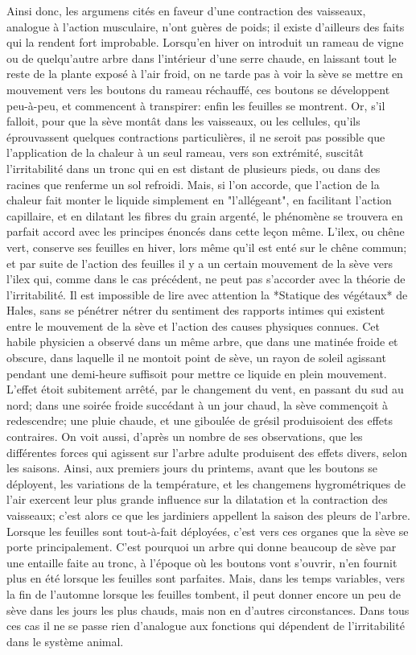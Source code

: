 Ainsi donc, les argumens cités en faveur d'une contraction des vaisseaux, analogue à l'action musculaire, n'ont guères de poids; il existe d'ailleurs des faits qui la rendent fort improbable.
Lorsqu'en hiver on introduit un rameau de vigne ou de quelqu'autre arbre dans l'intérieur d'une serre chaude, en laissant tout\setcounter{page}{100} le reste de la plante exposé à l'air froid, on ne tarde pas à voir la sève se mettre en mouvement vers les boutons du rameau réchauffé, ces boutons se développent peu-à-peu, et commencent à transpirer: enfin les feuilles se montrent. Or, s'il falloit, pour que la sève montât dans les vaisseaux, ou les cellules, qu'ils éprouvassent quelques contractions particulières, il ne seroit pas possible que l'application de la chaleur à un seul rameau, vers son extrémité, suscitât l'irritabilité dans un tronc qui en est distant de plusieurs pieds, ou dans des racines que renferme un sol refroidi. Mais, si l'on accorde, que l'action de la chaleur fait monter le liquide simplement en "l'allégeant", en facilitant l'action capillaire, et en dilatant les fibres du grain argenté, le phénomène se trouvera en parfait accord avec les principes énoncés dans cette leçon même.
L'ilex, ou chêne vert, conserve ses feuilles en hiver, lors même qu'il est enté sur le chêne commun; et par suite de l'action des feuilles il y a un certain mouvement de la sève vers l'ilex qui, comme dans le cas précédent, ne peut pas s'accorder avec la théorie de l'irritabilité.
Il est impossible de lire avec attention la *Statique des végétaux* de Hales, sans se pénétrer\setcounter{page}{101} nétrer du sentiment des rapports intimes qui existent entre le mouvement de la sève et l'action des causes physiques connues. Cet habile physicien a observé dans un même arbre, que dans une matinée froide et obscure, dans laquelle il ne montoit point de sève, un rayon de soleil agissant pendant une demi-heure suffisoit pour mettre ce liquide en plein mouvement. L'effet étoit subitement arrêté, par le changement du vent, en passant du sud au nord; dans une soirée froide succédant à un jour chaud, la sève commençoit à redescendre; une pluie chaude, et une giboulée de grésil produisoient des effets contraires.
On voit aussi, d'après un nombre de ses observations, que les différentes forces qui agissent sur l'arbre adulte produisent des effets divers, selon les saisons.
Ainsi, aux premiers jours du printems, avant que les boutons se déployent, les variations de la température, et les changemens hygrométriques de l'air exercent leur plus grande influence sur la dilatation et la contraction des vaisseaux; c'est alors ce que les jardiniers appellent la saison des pleurs de l'arbre. Lorsque les feuilles sont tout-à-fait déployées, c'est vers ces organes que la sève se porte principalement. C'est pourquoi un\setcounter{page}{102} arbre qui donne beaucoup de sève par une entaille faite au tronc, à l'époque où les boutons vont s'ouvrir, n'en fournit plus en été lorsque les feuilles sont parfaites. Mais, dans les temps variables, vers la fin de l'automne lorsque les feuilles tombent, il peut donner encore un peu de sève dans les jours les plus chauds, mais non en d'autres circonstances. Dans tous ces cas il ne se passe rien d'analogue aux fonctions qui dépendent de l'irritabilité dans le système animal.
